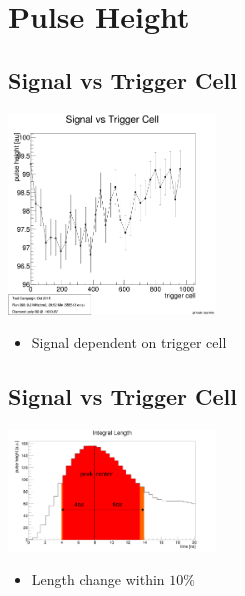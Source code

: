 \documentclass[9pt]{beamer}
\begin{document}
\section{Pulse Height}
\subsection{Signal vs Trigger Cell}
\begin{frame}
	\begin{center}
		\includegraphics[width=5.5cm]{SignalVsTriggerCell}
	\end{center}
	\begin{itemize}
		\item Signal dependent on trigger cell
	\end{itemize}
\end{frame}
\subsection{Signal vs Trigger Cell}
\begin{frame}
	\begin{center}
		\includegraphics[width=5.5cm]{IntegralLength}
	\end{center}
	\begin{itemize}
		\item Length change within $10\%$
	\end{itemize}
\end{frame}
\end{document}
